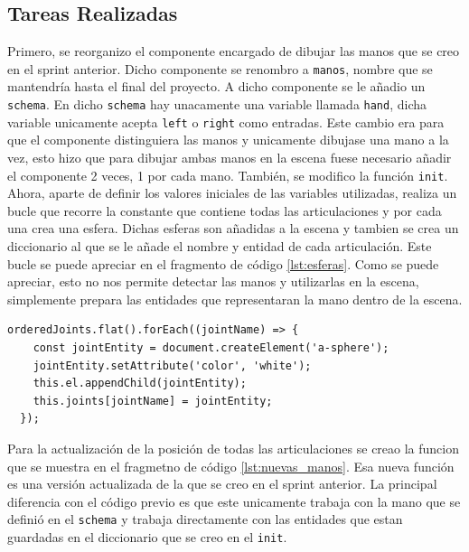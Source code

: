 \documentclass[a4paper, 12pt]{book}
\begin{document}
\subsection{Tareas Realizadas}
\label{subsec:implementacion2}
Primero, se reorganizo el componente encargado de dibujar las manos que se creo en el sprint anterior. Dicho componente se renombro a \texttt{manos}, nombre que se mantendría hasta el final del proyecto. A dicho componente se le añadio un \texttt{schema}. 
En dicho \texttt{schema} hay unacamente una variable llamada \texttt{hand}, dicha variable unicamente acepta \texttt{left} o \texttt{right} como entradas. Este cambio era para que el componente distinguiera las manos y unicamente dibujase una mano a la vez, esto hizo que para dibujar ambas manos en la escena fuese necesario añadir el componente 2 veces, 1 por cada mano. 
También, se modifico la función \texttt{init}. Ahora, aparte de definir los valores iniciales de las variables utilizadas, realiza un bucle que recorre la constante que contiene todas las articulaciones y por cada una crea una esfera. Dichas esferas son añadidas a la escena y tambien se crea un diccionario al que se le añade el nombre y entidad de cada articulación.
Este bucle se puede apreciar en el fragmento de código \ref{lst:esferas}. Como se puede apreciar, esto no nos permite detectar las manos y utilizarlas en la escena, simplemente prepara las entidades que representaran la mano dentro de la escena.

\begin{lstlisting}[caption=Creación de las esferas de las articulaciones, captionpos=b, label=lst:esferas]
  orderedJoints.flat().forEach((jointName) => {
    const jointEntity = document.createElement('a-sphere');
    jointEntity.setAttribute('color', 'white'); 
    this.el.appendChild(jointEntity);
    this.joints[jointName] = jointEntity;
  });
\end{lstlisting}

Para la actualización de la posición de todas las articulaciones se creao la funcion que se muestra en el fragmetno de código \ref{lst:nuevas_manos}. Esa nueva función es una versión actualizada de la que se creo en el sprint anterior. 
La principal diferencia con el código previo es que este unicamente trabaja con la mano que se definió en el \texttt{schema} y trabaja directamente con las entidades que estan guardadas en el diccionario que se creo en el \texttt{init}. 
\end{document}
